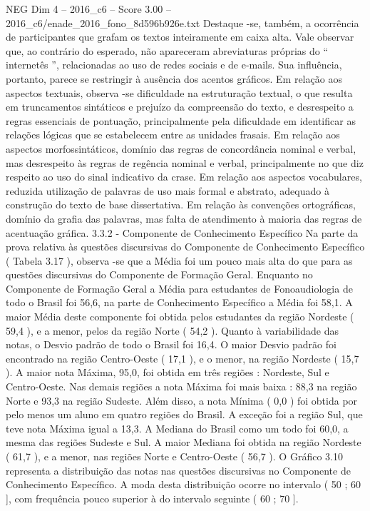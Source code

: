 \begin{textsample}{NEG Dim 4 – 2016\_c6 – Score 3.00 – 2016\_c6/enade\_2016\_fono\_8d596b926e.txt}
Destaque -se, também, a ocorrência de participantes que grafam os textos inteiramente em caixa alta.
Vale observar que, ao contrário do esperado, não apareceram abreviaturas próprias do “ internetês ”, relacionadas ao uso de redes sociais e de e-mails.
Sua influência, portanto, parece se restringir à ausência dos acentos gráficos.
Em relação aos aspectos textuais, observa -se dificuldade na estruturação textual, o que resulta em truncamentos sintáticos e prejuízo da compreensão do texto, e desrespeito a regras essenciais de pontuação, principalmente pela dificuldade em identificar as relações lógicas que se estabelecem entre as unidades frasais.
Em relação aos aspectos morfossintáticos, domínio das regras de concordância nominal e verbal, mas desrespeito às regras de regência nominal e verbal, principalmente no que diz respeito ao uso do sinal indicativo da crase.
Em relação aos aspectos vocabulares, reduzida utilização de palavras de uso mais formal e abstrato, adequado à construção do texto de base dissertativa.
Em relação às convenções ortográficas, domínio da grafia das palavras, mas falta de atendimento à maioria das regras de acentuação gráfica. 3.3.2 - Componente de Conhecimento Específico Na parte da prova relativa às questões discursivas do Componente de Conhecimento Específico ( Tabela 3.17 ), observa -se que a Média foi um pouco mais alta do que para as questões discursivas do Componente de Formação Geral.
Enquanto no Componente de Formação Geral a Média para estudantes de Fonoaudiologia de todo o Brasil foi 56,6, na parte de Conhecimento Específico a Média foi 58,1.
A maior Média deste componente foi obtida pelos estudantes da região Nordeste ( 59,4 ), e a menor, pelos da região Norte ( 54,2 ).
Quanto à variabilidade das notas, o Desvio padrão de todo o Brasil foi 16,4.
O maior Desvio padrão foi encontrado na região Centro-Oeste ( 17,1 ), e o menor, na região Nordeste ( 15,7 ).
A maior nota Máxima, 95,0, foi obtida em três regiões : Nordeste, Sul e Centro-Oeste.
Nas demais regiões a nota Máxima foi mais baixa : 88,3 na região Norte e 93,3 na região Sudeste.
Além disso, a nota Mínima ( 0,0 ) foi obtida por pelo menos um aluno em quatro regiões do Brasil.
A exceção foi a região Sul, que teve nota Máxima igual a 13,3.
A Mediana do Brasil como um todo foi 60,0, a mesma das regiões Sudeste e Sul.
A maior Mediana foi obtida na região Nordeste ( 61,7 ), e a menor, nas regiões Norte e Centro-Oeste ( 56,7 ).
O Gráfico 3.10 representa a distribuição das notas nas questões discursivas no Componente de Conhecimento Específico.
A moda desta distribuição ocorre no intervalo ( 50 ; 60 ], com frequência pouco superior à do intervalo seguinte ( 60 ; 70 ].

\end{textsample}
